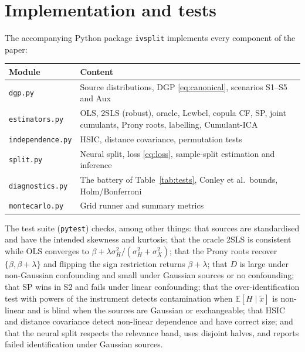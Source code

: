 \documentclass[11pt]{article}
\theoremstyle{definition}
\theoremstyle{remark}
\newcommand{\E}{\mathbb{E}}
\newcommand{\tx}{\tilde{x}}
\begin{document}
\appendix
\section{Implementation and tests}\label{app:code}

The accompanying Python package \texttt{ivsplit} implements every component of the paper:

\begin{center}
\small
\begin{tabularx}{\textwidth}{@{}l X@{}}
\toprule
Module & Content \\
\midrule
\texttt{dgp.py} & Source distributions, DGP \eqref{eq:canonical}, scenarios S1--S5 and Aux \\
\texttt{estimators.py} & OLS, 2SLS (robust), oracle, Lewbel, copula CF, SP, joint cumulants, Prony roots, labelling, Cumulant-ICA \\
\texttt{independence.py} & HSIC, distance covariance, permutation tests \\
\texttt{split.py} & Neural split, loss \eqref{eq:loss}, sample-split estimation and inference \\
\texttt{diagnostics.py} & The battery of Table~\ref{tab:tests}, Conley et al.\ bounds, Holm/Bonferroni \\
\texttt{montecarlo.py} & Grid runner and summary metrics \\
\bottomrule
\end{tabularx}
\end{center}

The test suite (\texttt{pytest}) checks, among other things: that sources are standardised and have
the intended skewness and kurtosis; that the oracle 2SLS is consistent while OLS converges to
$\beta + \lambda\sigma_H^2/(\sigma_H^2+\sigma_X^2)$; that the Prony roots recover $\{\beta,\beta+\lambda\}$
and flipping the sign restriction returns $\beta+\lambda$; that $D$ is large under non-Gaussian
confounding and small under Gaussian sources or no confounding; that SP wins in S2 and fails under
linear confounding; that the over-identification test with powers of the instrument detects
contamination when $\E[H\mid\tx]$ is non-linear and is blind when the sources are Gaussian or
exchangeable; that HSIC and distance covariance detect non-linear dependence and have correct size;
and that the neural split respects the relevance band, uses disjoint halves, and reports failed
identification under Gaussian sources.

\begingroup\sloppy


\endgroup
\end{document}
